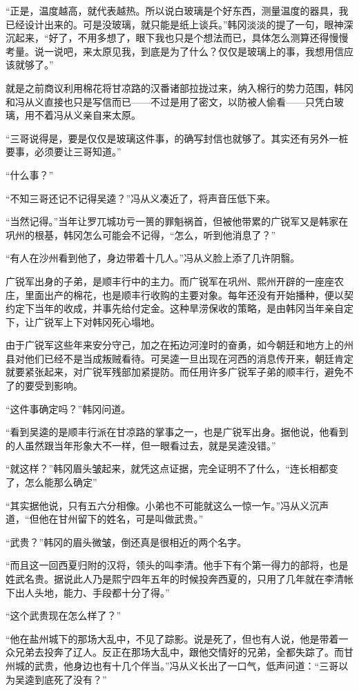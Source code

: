 “正是，温度越高，就代表越热。所以说白玻璃是个好东西，测量温度的器具，我已经设计出来的。可是没玻璃，就只能是纸上谈兵。”韩冈淡淡的提了一句，眼神深沉起来，“好了，不用多想了，眼下我也只是个想法而已，具体怎么测算还得慢慢考量。说一说吧，来太原见我，到底是为了什么？仅仅是玻璃上的事，我想用信应该就够了。”

就是之前商议利用棉花将甘凉路的汉番诸部拉拢过来，纳入棉行的势力范围，韩冈和冯从义直接也只是写信而已——不过是用了密文，以防被人偷看——只凭白玻璃，用不着冯从义亲自来太原。

“三哥说得是，要是仅仅是玻璃这件事，的确写封信也就够了。其实还有另外一桩要事，必须要让三哥知道。”

“什么事？”

“不知三哥还记不记得吴逵？”冯从义凑近了，将声音压低下来。

“当然记得。”当年让罗兀城功亏一篑的罪魁祸首，但被他带累的广锐军又是韩家在巩州的根基，韩冈怎么可能会不记得，“怎么，听到他消息了？”

“有人在沙州看到他了，身边带着十几人。”冯从义脸上添了几许阴翳。

广锐军出身的子弟，是顺丰行中的主力。而广锐军在巩州、熙州开辟的一座座农庄，里面出产的棉花，也是顺丰行收购的主要对象。每年还没有开始播种，便以契约定下当年的收成，并事先给付定金。这种旱涝保收的策略，是由韩冈当年亲自定下，让广锐军上下对韩冈死心塌地。

由于广锐军这些年来安分守己，加之在拓边河湟时的奋勇，如今朝廷和地方上的州县对他们已经不是当成叛贼看待。可吴逵一旦出现在河西的消息传开来，朝廷肯定就要紧张起来，对广锐军残部加紧提防。而任用许多广锐军子弟的顺丰行，避免不了的要受到影响。

“这件事确定吗？”韩冈问道。

“看到吴逵的是顺丰行派在甘凉路的掌事之一，也是广锐军出身。据他说，他看到的人虽然跟当年形象大不一样，但一眼看过去，就是吴逵没错。”

“就这样？”韩冈眉头皱起来，就凭这点证据，完全证明不了什么，“连长相都变了，怎么能那么确定”

“其实据他说，只有五六分相像。小弟也不可能就这么一惊一乍。”冯从义沉声道，“但他在甘州留下的姓名，可是叫做武贵。”

“武贵？”韩冈的眉头微皱，倒还真是很相近的两个名字。

“而且这一回西夏归附的汉将，领头的叫李清。他手下有个第一得力的部将，也是姓武名贵。据说此人乃是熙宁四年五年的时候投奔西夏的，只用了几年就在李清帐下出人头地，能力、手段都十分了得。”

“这个武贵现在怎么样了？”

“他在盐州城下的那场大乱中，不见了踪影。说是死了，但也有人说，他是带着一众兄弟去投奔了辽人。反正在那场大乱中，跟他交情好的兄弟，全都失踪了。而甘州城的武贵，他身边也有十几个伴当。”冯从义长出了一口气，低声问道：“三哥以为吴逵到底死了没有？”

